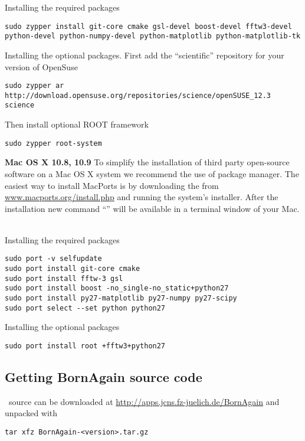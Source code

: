 \noindent
Installing the required packages
\begin{lstlisting}[language=shell, style=commandline]
sudo zypper install git-core cmake gsl-devel boost-devel fftw3-devel python-devel python-numpy-devel python-matplotlib python-matplotlib-tk
\end{lstlisting}

\noindent
Installing the optional packages. First add the ``scientific'' repository for your version of OpenSuse


\noindent
\begin{lstlisting}[language=shell, style=commandline]
sudo zypper ar http://download.opensuse.org/repositories/science/openSUSE_12.3 science
\end{lstlisting}

\noindent
Then install optional ROOT framework
\begin{lstlisting}[language=shell, style=commandline]
sudo zypper root-system 
\end{lstlisting}
\vspace*{3mm}



\noindent
\noindent
{\large\bf Mac OS X 10.8, 10.9} \newline
To simplify the installation of third party open-source software on a Mac OS X system we recommend the use of  package manager. 
The easiest way to install MacPorts is by downloading the  
from \url{www.macports.org/install.php} and running the system's installer.
After the installation new command ``'' will be available
in a terminal window of your Mac. \


\noindent
Installing the required packages
\begin{lstlisting}[language=shell, style=commandline]
sudo port -v selfupdate
sudo port install git-core cmake
sudo port install fftw-3 gsl
sudo port install boost -no_single-no_static+python27 
sudo port install py27-matplotlib py27-numpy py27-scipy
sudo port select --set python python27
\end{lstlisting}

\noindent
Installing the optional packages
\begin{lstlisting}[language=shell, style=commandline]
sudo port install root +fftw3+python27
\end{lstlisting}




\subsection{Getting {\rm\bf BornAgain} source code}
\BornAgain\ source can be downloaded at \url{http://apps.jcns.fz-juelich.de/BornAgain}
and unpacked with
\begin{lstlisting}[language=shell, style=commandline]
tar xfz BornAgain-<version>.tar.gz
\end{lstlisting}

